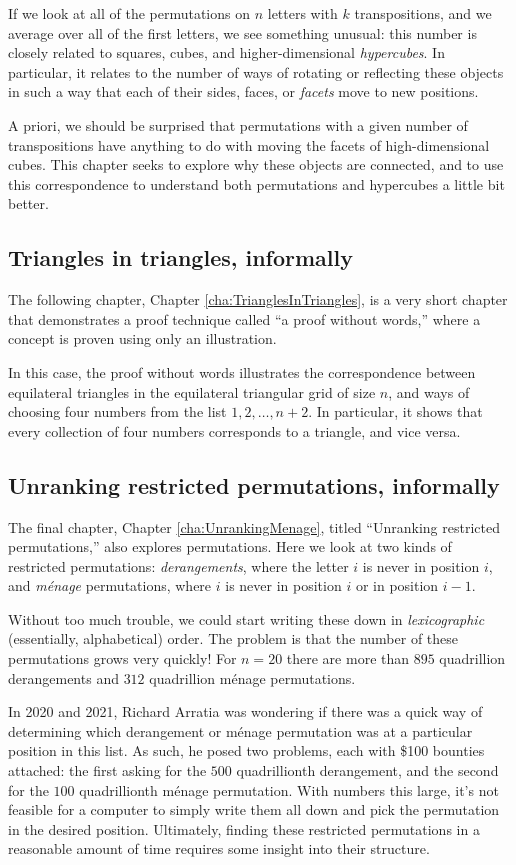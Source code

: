 If we look at all of the permutations on $n$ letters with $k$ transpositions,
and we average over all of the first letters, we see
something unusual: this number is closely related to
squares, cubes, and higher-dimensional \textit{hypercubes}.
In particular, it relates to the number of ways of rotating or reflecting
these objects in such a way that each of their sides, faces, or \textit{facets}
move to new positions.

A priori, we should be surprised that permutations with a given number of
transpositions have anything to do with moving the facets of high-dimensional
cubes. This chapter seeks to explore why these objects are connected, and
to use this correspondence to understand both permutations and hypercubes a
little bit better.

\subsection{Triangles in triangles, informally}
The following chapter, Chapter \ref{cha:TrianglesInTriangles}, is a very short
chapter that demonstrates a proof technique called ``a proof without words,''
where a concept is proven using only an illustration.

In this case, the proof without words illustrates the correspondence between
equilateral triangles in the equilateral triangular grid of size $n$, and
ways of choosing four numbers from the list $1, 2, \dots, n+2$. In particular,
it shows that every collection of four numbers corresponds to a triangle, and
vice versa.

\subsection{Unranking restricted permutations, informally}
The final chapter, Chapter \ref{cha:UnrankingMenage},
titled ``Unranking restricted permutations,''
also explores permutations.
Here we look at
two kinds of restricted permutations: \textit{derangements}, where the letter $i$ is never
in position $i$, and \textit{m\'enage} permutations, where $i$ is never in
position $i$ or in position $i - 1$.

Without too much trouble, we could start writing these down in
\textit{lexicographic} (essentially, alphabetical) order. The
problem is that the number of these permutations grows very quickly! For
$n=20$ there are more than $895$ quadrillion derangements and
$312$ quadrillion m\'enage permutations.

In 2020 and 2021, Richard Arratia
was wondering if there was a quick way of determining which derangement or
m\'enage permutation was at a particular position in this list.
As such, he posed two problems, each with \$100 bounties attached:
the first asking for the $500$ quadrillionth derangement, and
the second for the $100$ quadrillionth m\'enage permutation.
With numbers this large, it's not feasible for a computer to simply
write them all down and pick the permutation in the desired position.
Ultimately, finding these restricted permutations in a reasonable amount of time
requires some insight into their structure.

